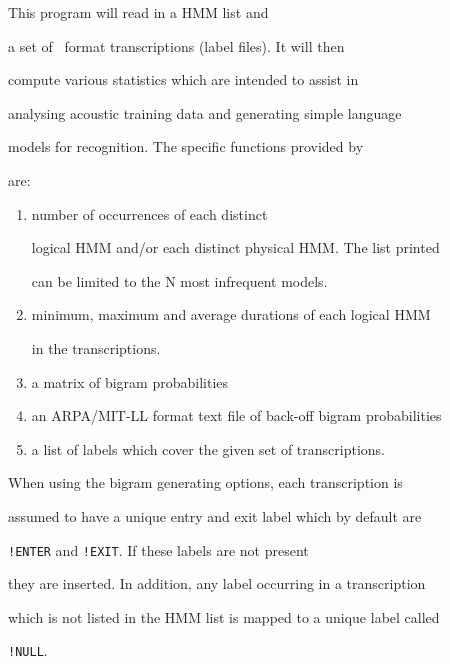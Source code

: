 This program will read in a HMM list and 


a set of \HTK\ format transcriptions (label files).  It will then 


compute various statistics which are intended to assist in 


analysing acoustic training data and generating simple language


models for recognition.  The specific functions provided by 


are:


\begin{enumerate}


\item number of occurrences of each distinct 


      logical HMM and/or each distinct physical HMM.  The list printed


      can be limited to the N most infrequent models.


\item minimum, maximum and average durations of each logical HMM


      in the transcriptions.


\item a matrix of bigram probabilities


\item an ARPA/MIT-LL format text file of back-off bigram probabilities


\item a list of labels which cover the given set of transcriptions.


\end{enumerate}










When using the bigram generating options, each transcription is 


assumed to have a unique entry and exit label which by default are


\texttt{!ENTER} and \texttt{!EXIT}.  If these labels are not present


they are inserted.  In addition, any label occurring in a transcription


which is not listed in the HMM list is mapped to a unique label called


\texttt{!NULL}.





